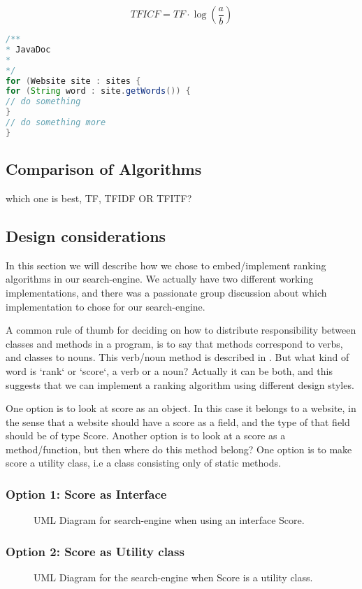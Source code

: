 \[ TFICF = TF \cdot \log{\left( \frac{a}{b} \right) } \]


\begin{lstlisting}[language=Java, caption=This is a code example., label=lst:TFICF]
/**
* JavaDoc
*
*/
for (Website site : sites {
for (String word : site.getWords()) {
// do something	
}
// do something more
}
\end{lstlisting}




\subsection{Comparison of Algorithms}
which one is best, TF, TFIDF OR TFITF?


\subsection{Design considerations}
In this section we will describe how we chose to embed/implement ranking algorithms in our search-engine. We actually have two different working implementations, and there was a passionate group discussion about which implementation to chose for our search-engine.  

A common rule of thumb for deciding on how to distribute responsibility between classes and methods in a program, is to say that methods correspond to verbs, and classes to nouns. This verb/noun method is described in \cite[p.530]{BK}.
But what kind of word is `rank` or `score`, a verb or a noun? Actually it can be both, and this suggests that we can implement a ranking algorithm using different design styles.

One option is to look at score as an object. In this case it belongs to a website, in the sense that a website should have a score as a field, and the type of that field should be of type Score.
Another option is to look at a score as a method/function, but then where do this method belong? One option is to make score a utility class, i.e a class consisting only of static methods. 

\subsubsection{Option 1: Score as Interface}
\begin{figure}[t]
	\centering
	\caption{UML Diagram for search-engine when using an interface Score.}
	\label{fig:uml:score-as-interface}
\end{figure}

\subsubsection{Option 2: Score as Utility class}
\begin{figure}[t]
	\centering
	\caption{UML Diagram for the search-engine when Score is a utility class.}
	\label{fig:uml:score-as-utility}
\end{figure}




